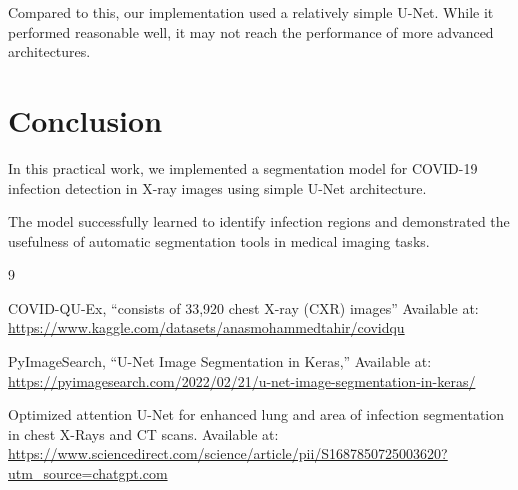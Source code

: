 \documentclass[10pt,twocolumn]{article}
\begin{document}
Compared to this, our implementation
used a relatively simple U-Net. While it performed reasonable
well, it may not reach the performance of more advanced architectures.

\section{Conclusion}

In this practical work, we implemented a segmentation model 
for COVID-19 infection detection in X-ray images using simple U-Net architecture. 

The model successfully learned to identify infection regions and demonstrated the usefulness of automatic segmentation tools in medical imaging tasks.

\begin{thebibliography}{9}

COVID-QU-Ex, 
``consists of 33,920 chest X-ray (CXR) images'' 
Available at: \url{https://www.kaggle.com/datasets/anasmohammedtahir/covidqu}

PyImageSearch, 
``U-Net Image Segmentation in Keras,'' 
Available at: \url{https://pyimagesearch.com/2022/02/21/u-net-image-segmentation-in-keras/}

Optimized attention U-Net for enhanced lung and area of infection segmentation in chest X-Rays and CT scans. 
Available at: \url{https://www.sciencedirect.com/science/article/pii/S1687850725003620?utm_source=chatgpt.com}

\end{thebibliography}
\end{document}
